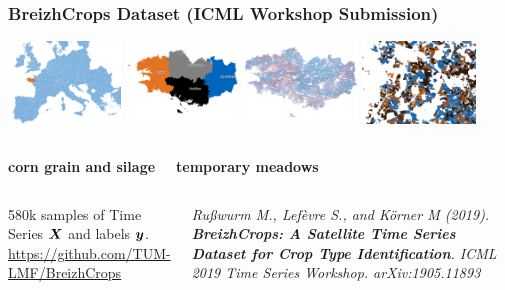 \begin{frame}
\frametitle{BreizhCrops Dataset (ICML Workshop Submission)}

\begin{center}
	\includegraphics[width=3cm]{images/map/europe}
	\includegraphics[width=3cm]{images/map/regions}
	\includegraphics[width=3cm]{images/map/breizh}
	\includegraphics[width=3cm]{images/map/parcels}
\end{center}



\begin{columns}
	
	\textbf{corn grain and silage}
	
	
	\textbf{temporary meadows}
	
\end{columns}



\begin{columns}
	
	580k samples of Time Series $\M{X}$ and labels $\V{y}$. \Large \url{https://github.com/TUM-LMF/BreizhCrops}
	
	
	\small\raggedright
	\textsl{
		Rußwurm M., Lefèvre S., and Körner M (2019). \textbf{BreizhCrops: A Satellite Time Series Dataset for Crop Type Identification}. ICML 2019 Time Series Workshop. arXiv:1905.11893
	}
	
\end{columns}

\end{frame}


